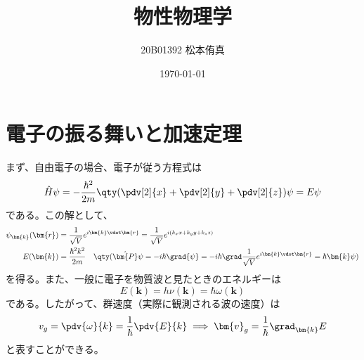 
\usepackage{nicematrix}
\title{物性物理学}
\author{20B01392 松本侑真}
\date{\today}

\maketitle
\begin{abstract}

\end{abstract}
\tableofcontents
\newpage
\section{電子の振る舞いと加速定理}
まず、自由電子の場合、電子が従う方程式は
\begin{equation}
	\hat{H}\psi = -\frac{\hbar^2}{2m}\qty(\pdv[2]{x} + \pdv[2]{y} + \pdv[2]{z})\psi = E\psi
\end{equation}
である。この解として、
\begin{align}
	\psi_{\bm{k}}(\bm{r}) & = \frac{1}{\sqrt{V}}e^{i\bm{k}\vdot\bm{r}} = \frac{1}{\sqrt{V}}e^{i(k_xx + k_yy + k_zz)}                                                         \\
	E(\bm{k})             & = \frac{\hbar^2k^2}{2m}\quad\qty(\hat{\bm{P}}\psi = -i\hbar\grad{\psi} = -i\hbar\grad\frac{1}{\sqrt{V}}e^{i\bm{k}\vdot\bm{r}} = \hbar\bm{k}\psi)
\end{align}
を得る。また、一般に電子を物質波と見たときのエネルギーは
\begin{equation}
	E(\bm{k}) = h\nu(\bm{k}) = \hbar\omega(\bm{k})
\end{equation}
である。したがって、群速度（実際に観測される波の速度）は
\begin{equation}
	v_{g} = \pdv{\omega}{k} = \frac{1}{\hbar}\pdv{E}{k}\implies \bm{v}_g = \frac{1}{\hbar}\grad_{\bm{k}}E
\end{equation}
と表すことができる。
